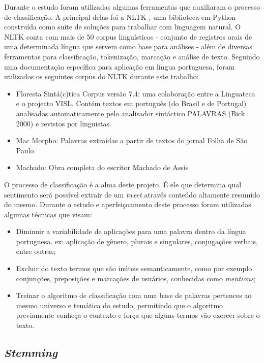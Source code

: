 Durante o estudo foram utilizadas algumas ferramentas que auxiliaram o processo de classificação. A principal delas foi a \ac{NLTK} \cite{nltk_docs}, uma biblioteca em Python construída como suíte de soluções para trabalhar com linguagem natural. O NLTK conta com mais de 50 corpus linguísticos - conjunto de registros orais de uma determinada língua que servem como base para análises - além de diversas ferramentas para classificação, tokenização, marcação e análise de texto. Seguindo uma documentação específica para aplicação em língua portuguesa\cite{nltk_portuguese}, foram utilizados os seguintes corpus do NLTK durante este trabalho:

\begin{itemize}
	\item Floresta Sintá(c)tica Corpus versão 7.4: uma colaboração entre a Linguateca\cite{linguateca} e o projecto VISL\cite{visl}. Contém textos em português (do Brasil e de Portugal) analisados automaticamente pelo analisador sintáctico PALAVRAS (Bick 2000) e revistos por linguistas.
	\item Mac Morpho: Palavras extraídas a partir de textos do jornal Folha de São Paulo 
	\item Machado: Obra completa do escritor Machado de Assis
\end{itemize}

O processo de classificação é a alma deste projeto. É ele que determina qual sentimento será possível extrair de um \textit{tweet} através conteúdo altamente resumido do mesmo. Durante o estudo e aperfeiçoamento deste processo foram utilizadas algumas técnicas que visam:

\begin{itemize}
	\item Diminuir a variabilidade de aplicações para uma palavra dentro da língua portuguesa. ex: aplicação de gênero, plurais e singulares, conjugações verbais, entre outras;
	\item Excluir do texto termos que são inúteis semanticamente, como por exemplo conjunções, preposições e marcações de usuários, conhecidas como \textit{mentions};
	\item Treinar o algoritmo de classificação com uma base de palavras pertences ao mesmo universo e temática do estudo, permitindo que o algoritmo previamente conheça o contexto e força que alguns termos vão exercer sobre o texto.
\end{itemize}

\subsection{\textit{Stemming}}

